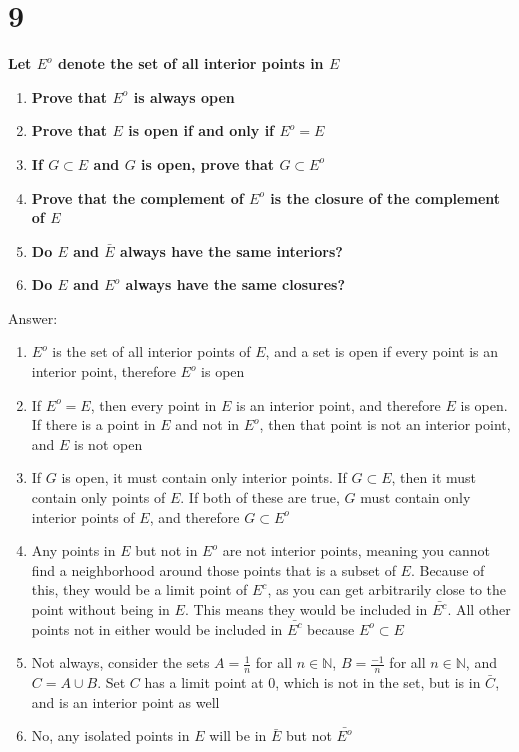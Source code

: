 \documentclass{article}
\begin{document}
\section*{9}
\noindent \textbf{Let $E^o$ denote the set of all interior points in $E$}
\begin{enumerate}[label=(\alph*)]
    \item \textbf{Prove that $E^o$ is always open}
    \item \textbf{Prove that $E$ is open if and only if $E^o = E$}
    \item \textbf{If $G \subset E$ and $G$ is open, prove that $G \subset E^o$}
    \item \textbf{Prove that the complement of $E^o$ is the closure of the complement of $E$}
    \item \textbf{Do $E$ and $\bar{E}$ always have the same interiors?}
    \item \textbf{Do $E$ and $E^o$ always have the same closures?}
\end{enumerate}
Answer:
\begin{enumerate}[label=(\alph*)]
    \item $E^o$ is the set of all interior points of $E$, and a set is open if every point is an interior point, therefore $E^o$ is open
    \item If $E^o = E$, then every point in $E$ is an interior point, and therefore $E$ is open. If there is a point in $E$ and not in $E^o$, then that point is not an interior point, and $E$ is not open
    \item If $G$ is open, it must contain only interior points. If $G \subset E$, then it must contain only points of $E$. If both of these are true, $G$ must contain only interior points of $E$, and therefore $G \subset E^o$
    \item Any points in $E$ but not in $E^o$ are not interior points, meaning you cannot find a neighborhood around those points that is a subset of $E$. Because of this, they would be a limit point of $E^c$, as you can get arbitrarily close to the point without being in $E$. This means they would be included in $\bar{E^c}$. All other points not in either would be included in $\bar{E^c}$ because $E^o \subset E$
    \item Not always, consider the sets $A = \frac{1}{n}$ for all $n \in \mathbb{N}$, $B = \frac{-1}{n}$ for all $n \in \mathbb{N}$, and $C = A \cup B$. Set $C$ has a limit point at 0, which is not in the set, but is in $\bar C$, and is an interior point as well
    \item No, any isolated points in $E$ will be in $\bar E$ but not $\bar{E^o}$
\end{enumerate}
\end{document}
